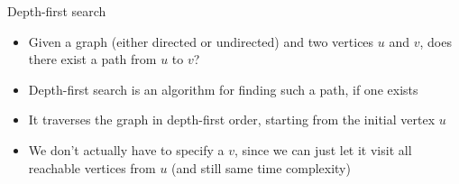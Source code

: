 \documentclass[12pt,t]{beamer}
\newcommand{\bi}{\begin{itemize}}
\newcommand{\ei}{\end{itemize}}
\begin{document}

\begin{frame}{Depth-first search}
    \vspace{10pt}
    \bi
\item Given a graph (either directed or undirected) and two vertices $u$ and $v$, does there exist a path from $u$ to $v$?
\item Depth-first search is an algorithm for finding such a path, if one exists
    \vspace{10pt}

\item It traverses the graph in depth-first order, starting from the initial vertex $u$
\item We don't actually have to specify a $v$, since we can just let it visit all reachable vertices from $u$ (and still same time complexity)
    \ei
\end{frame}
\end{document}
